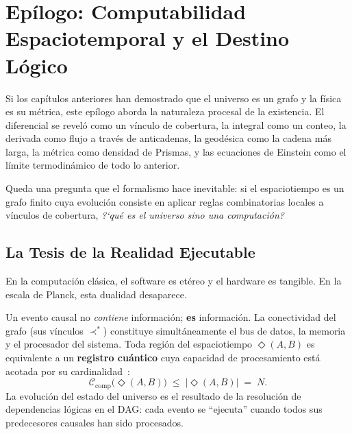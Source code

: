 \documentclass[11pt, a4paper, openany]{book}
\newcommand{\covers}{\prec^{\!*}}
\newcommand{\diam}[2]{\Diamond(#1,#2)}
\begin{document}

\chapter*{Ep\'ilogo: Computabilidad Espaciotemporal y el Destino L\'ogico}

Si los cap\'itulos anteriores han demostrado que el universo es un
grafo y la f\'isica es su m\'etrica, este ep\'ilogo aborda la
naturaleza procesal de la existencia. El diferencial se revel\'o como
un v\'inculo de cobertura, la integral como un conteo, la derivada
como flujo a trav\'es de anticadenas, la geod\'esica como la cadena
m\'as larga, la m\'etrica como densidad de Prismas, y las ecuaciones
de Einstein como el l\'imite termodin\'amico de todo lo anterior.

Queda una pregunta que el formalismo hace inevitable: si el
espaciotiempo es un grafo finito cuya evoluci\'on consiste en aplicar
reglas combinatorias locales a v\'inculos de cobertura,
\textit{?`qu\'e es el universo sino una
computaci\'on?}~\cite{wheeler1990,lloyd2002}

\section*{La Tesis de la Realidad Ejecutable}

En la computaci\'on cl\'asica, el software es et\'ereo y el hardware
es tangible. En la escala de Planck, esta dualidad desaparece.

\begin{theorem}
\label{cor:kuratowski-turing}
Un evento causal no \emph{contiene} informaci\'on;
\textbf{es} informaci\'on. La conectividad del grafo (sus v\'inculos
$\covers$) constituye simult\'aneamente el bus de datos, la
memoria y el procesador del sistema. Toda regi\'on del espaciotiempo
$\diam{A}{B}$ es equivalente a un \textbf{registro cu\'antico} cuya
capacidad de procesamiento est\'a acotada por su
cardinalidad~\cite{bekenstein1981,lloyd2002}:
\begin{equation}
  \mathcal{C}_{\text{comp}}\bigl(\diam{A}{B}\bigr)
  \;\leq\; |\diam{A}{B}| \;=\; N.
  \label{eq:computational-capacity}
\end{equation}
La evoluci\'on del estado del universo es el resultado de la
resoluci\'on de dependencias l\'ogicas en el DAG: cada evento se
``ejecuta'' cuando todos sus predecesores causales han sido
procesados.
\end{theorem}
\end{document}
